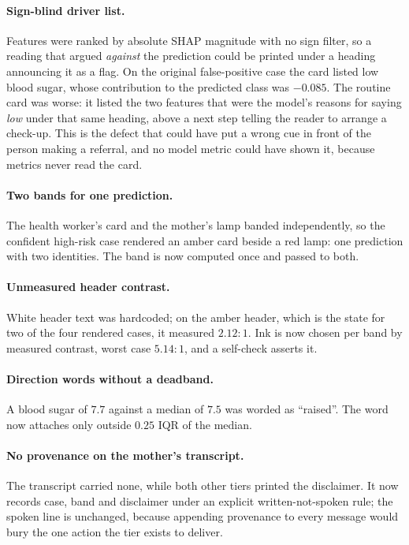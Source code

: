 \paragraph{Sign-blind driver list.} Features were ranked by absolute
SHAP magnitude with no sign filter, so a reading that argued \emph{against}
the prediction could be printed under a heading announcing it as a flag. On
the original false-positive case the card listed low blood sugar, whose
contribution to the predicted class was $-0.085$. The routine card was worse:
it listed the two features that were the model's reasons for saying \emph{low}
under that same heading, above a next step telling the reader to arrange a
check-up. This is the defect that could have put a wrong cue in front of the
person making a referral, and no model metric could have shown it, because
metrics never read the card.

\paragraph{Two bands for one prediction.} The health worker's card and the
mother's lamp banded independently, so the confident high-risk case rendered
an amber card beside a red lamp: one prediction with two identities. The band
is now computed once and passed to both.

\paragraph{Unmeasured header contrast.} White header text was hardcoded; on
the amber header, which is the state for two of the four rendered cases, it
measured $2.12{:}1$. Ink is now chosen per band by measured contrast, worst
case $5.14{:}1$, and a self-check asserts it.

\paragraph{Direction words without a deadband.} A blood sugar of $7.7$ against
a median of $7.5$ was worded as ``raised''. The word now attaches only outside
$0.25$ IQR of the median.

\paragraph{No provenance on the mother's transcript.} The transcript carried
none, while both other tiers printed the disclaimer. It now records case, band and disclaimer under
an explicit written-not-spoken rule; the spoken line is unchanged, because
appending provenance to every message would bury the one action the tier
exists to deliver.

